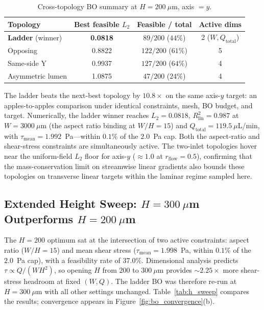 \documentclass[12pt]{article}
\begin{document}
\begin{table}[H]
\centering
\caption{Cross-topology BO summary at $H = 200~\mu$m, axis $= y$.}
\label{tab:cross_topology_summary}
\begin{tabular}{l c c c}
\toprule
\textbf{Topology} & \textbf{Best feasible $L_2$} & \textbf{Feasible / total} & \textbf{Active dims} \\
\midrule
\textbf{Ladder} (winner) & \textbf{0.0818} & $89/200$ ($44\%$) & 2 ($W, Q_{\text{total}}$) \\
Opposing                 & 0.8822          & $122/200$ ($61\%$) & 5 \\
Same-side Y              & 0.9937          & $127/200$ ($64\%$) & 4 \\
Asymmetric lumen         & 1.0875          & $47/200$  ($24\%$) & 4 \\
\bottomrule
\end{tabular}
\end{table}

The ladder beats the next-best topology by $10.8\times$ on the same axis-$y$ target: an apples-to-apples comparison under identical constraints, mesh, BO budget, and target. Numerically, the ladder winner reaches $L_2 = 0.0818$, $R^2_{\text{lin}} = 0.987$ at $W = 3000~\mu$m (the aspect ratio binding at $W/H = 15$) and $Q_{\text{total}} = 119.5~\mu$L/min, with $\tau_{\text{mean}} = 1.992$~Pa---within $0.1\%$ of the $2.0$~Pa cap. Both the aspect-ratio and shear-stress constraints are simultaneously active. The two-inlet topologies hover near the uniform-field $L_2$ floor for axis-$y$ ($\approx 1.0$ at $r_{\text{flow}} = 0.5$), confirming that the mass-conservation limit on streamwise linear gradients also bounds these topologies on transverse linear targets within the laminar regime sampled here.

\subsection{Extended Height Sweep: $H = 300~\mu$m Outperforms $H = 200~\mu$m}
\label{sec:h_sweep}
The $H = 200$ optimum sat at the intersection of two active constraints: aspect ratio ($W/H = 15$) and mean shear stress ($\tau_{\text{mean}} = 1.998$~Pa, within $0.1\%$ of the $2.0$~Pa cap), with a feasibility rate of $37.0\%$. Dimensional analysis predicts $\tau \propto Q / (W H^2)$, so opening $H$ from $200$ to $300~\mu$m provides $\sim 2.25\times$ more shear-stress headroom at fixed $(W, Q)$. The ladder BO was therefore re-run at $H = 300~\mu$m with all other settings unchanged. Table~\ref{tab:h_sweep} compares the results; convergence appears in Figure~\ref{fig:bo_convergence}(b).
\end{document}
